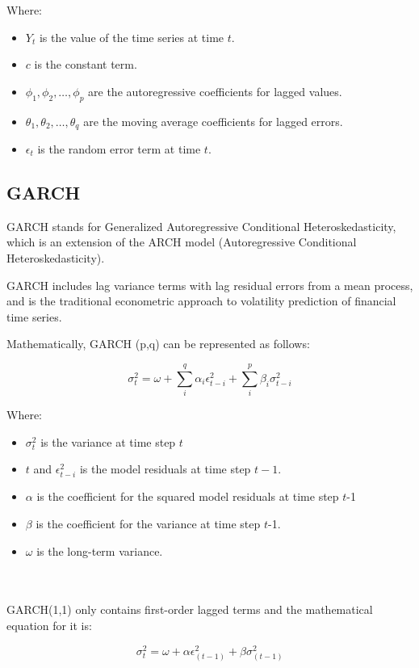 \documentclass{ieeeojies}
\begin{document}
Where:
\begin{itemize}
    \item \(Y_t\) is the value of the time series at time \(t\).
    \item \(c\) is the constant term.
    \item \(\phi_1, \phi_2, \dots, \phi_p\) are the autoregressive coefficients for lagged values.
    \item \(\theta_1, \theta_2, \dots, \theta_q\) are the moving average coefficients for lagged errors.
    \item \(\epsilon_t\) is the random error term at time \(t\).
\end{itemize}
\subsection{GARCH}
\indent GARCH stands for Generalized Autoregressive Conditional Heteroskedasticity, which is an extension of the ARCH model (Autoregressive Conditional Heteroskedasticity).

GARCH includes lag variance terms with lag residual errors from a mean process, and is the traditional econometric approach to volatility prediction of financial time series.

\indent Mathematically, GARCH (p,q) can be represented as follows:
\begin{center}
\begin{equation}
\sigma_{t}^{2} = \omega + \sum_{i}^{q} {\alpha_{i} } \epsilon_{t-i}^{2} + \sum_{i}^{p} \beta_{i} \sigma_{t-i}^{2}
\end{equation}
\end{center}
Where:
\begin{itemize}
    \item  $\sigma_{t}^{2}$ is the variance at time step $t$
    \item $t$ and $\epsilon_{t-i}^{2}$ is the model residuals at time step $t-1$.
    \item $\alpha$ is the coefficient for the squared model residuals at time step $t$-1 
    \item $\beta$ is the coefficient for the variance at time step $t$-1. 
    \item $\omega$ is the long-term variance.
 
\end{itemize}
\\\\
GARCH(1,1) only contains first-order lagged terms and the mathematical equation for it is:
\begin{center}
\begin{equation}
\sigma_{t}^{2} = \omega + \alpha \epsilon_{(t-1)}^{2} + \beta \sigma_{(t-1)}^{2}
\end{equation}
\end{center}
\end{document}
